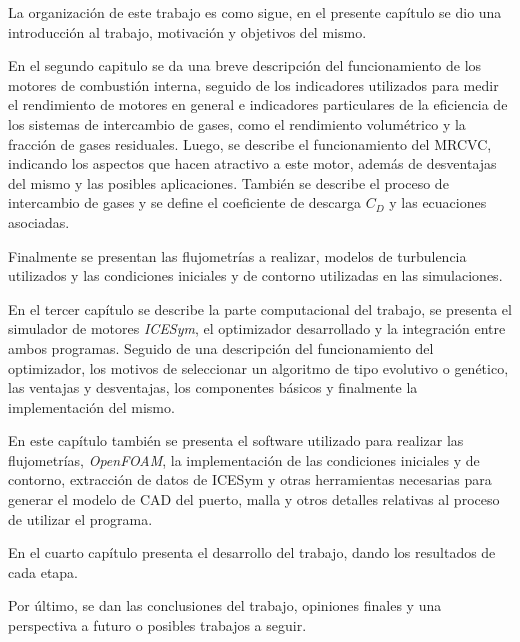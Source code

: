 
La organización de este trabajo es como sigue, en el presente capítulo se dio
una introducción al trabajo, motivación y objetivos del mismo.

En el segundo capitulo se da una breve descripción del funcionamiento de los
motores de combustión interna, seguido de los indicadores utilizados para medir
el rendimiento de motores en general e indicadores particulares de la
eficiencia de los sistemas de intercambio de gases, como el rendimiento
volumétrico y la fracción de gases residuales.
%
Luego, se describe el funcionamiento del MRCVC, indicando los aspectos que
hacen atractivo a este motor, además de desventajas del mismo y las posibles
aplicaciones.
%
También se describe el proceso de intercambio de gases y se define el
coeficiente de descarga $C_D$ y las ecuaciones asociadas.

Finalmente se presentan las flujometrías a realizar, modelos de turbulencia
utilizados y las condiciones iniciales y de contorno utilizadas en las
simulaciones.
%

En el tercer capítulo se describe la parte computacional del trabajo, se
presenta el simulador de motores \emph{ICESym}, el optimizador desarrollado y la
integración entre ambos programas.
%
Seguido de una descripción del funcionamiento del optimizador, los motivos de
seleccionar un algoritmo de tipo evolutivo o genético, las ventajas y
desventajas, los componentes básicos y finalmente la implementación del mismo.

En este capítulo también se presenta el software utilizado para realizar las
flujometrías, \emph{OpenFOAM}, la implementación de las condiciones iniciales y
de contorno, extracción de datos de ICESym y otras herramientas necesarias para
generar el modelo de CAD del puerto, malla y otros detalles relativas al proceso
de utilizar el programa.

En el cuarto capítulo presenta el desarrollo del trabajo, dando los resultados
de cada etapa.

Por último, se dan las conclusiones del trabajo, opiniones finales y una
perspectiva a futuro o posibles trabajos a seguir.
